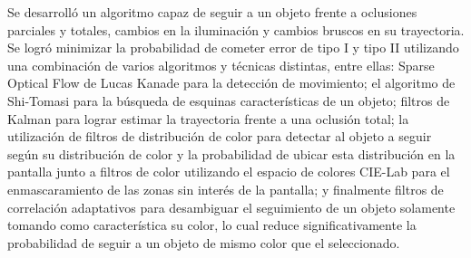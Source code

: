 Se desarrolló un algoritmo capaz de seguir a un objeto frente a oclusiones parciales y totales, cambios en la iluminación y cambios bruscos en su trayectoria. Se logró minimizar la probabilidad de cometer error de tipo I y tipo II utilizando una combinación de varios algoritmos y técnicas distintas, entre ellas: Sparse Optical Flow de Lucas Kanade para la detección de movimiento; el algoritmo de Shi-Tomasi para la búsqueda de esquinas características de un objeto; filtros de Kalman para lograr estimar la trayectoria frente a una oclusión total; la utilización de filtros de distribución de color para detectar al objeto a seguir según su distribución de color y la probabilidad de ubicar esta distribución en la pantalla junto a filtros de color utilizando el espacio de colores CIE-Lab para el enmascaramiento de las zonas sin interés de la pantalla; y finalmente filtros de correlación adaptativos para desambiguar el seguimiento de un objeto solamente tomando como característica su color, lo cual reduce significativamente la probabilidad de seguir a un objeto de mismo color que el seleccionado.




